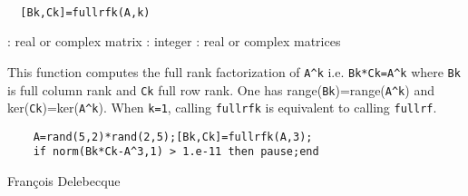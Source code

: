 
\begin{mandesc}
   \\ %
\end{mandesc}
\begin{calling_sequence}
\begin{verbatim}
  [Bk,Ck]=fullrfk(A,k)  
\end{verbatim}
\end{calling_sequence}
\begin{parameters}
  \begin{varlist}
    : real or complex matrix
    : integer
    : real or complex matrices
  \end{varlist}
\end{parameters}
\begin{mandescription}
  This function computes the full rank factorization of \verb!A^k! i.e.
  \verb!Bk*Ck=A^k! where \verb!Bk! is full column rank and \verb!Ck! full row rank.
  One has range(\verb!Bk!)=range(\verb!A^k!) and ker(\verb!Ck!)=ker(\verb!A^k!).
  When \verb!k=1!, calling \verb!fullrfk! is equivalent to calling \verb!fullrf!.
\end{mandescription}
\begin{examples}
  \begin{Verbatim}
    A=rand(5,2)*rand(2,5);[Bk,Ck]=fullrfk(A,3);
    if norm(Bk*Ck-A^3,1) > 1.e-11 then pause;end
  \end{Verbatim}
\end{examples}
\begin{manseealso}
     
\end{manseealso}
\begin{authors}
  Fran\c{c}ois Delebecque
\end{authors}
